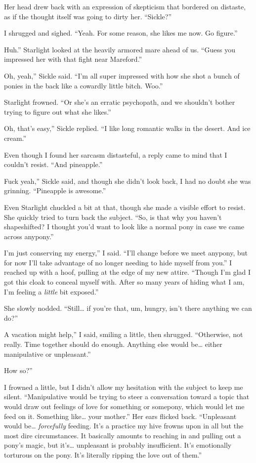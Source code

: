 Her head drew back with an expression of skepticism that bordered on distaste, as if the thought itself was going to dirty her. “Sickle?”

I shrugged and sighed. “Yeah. For some reason, she likes me now. Go figure.”

\leavevmode{}Huh.” Starlight looked at the heavily armored mare ahead of us. “Guess you impressed her with that fight near Mareford.”

\leavevmode{}Oh, yeah,” Sickle said. “I’m all super impressed with how she shot a bunch of ponies in the back like a cowardly little bitch. Woo.”

Starlight frowned. “Or she’s an erratic psychopath, and we shouldn’t bother trying to figure out what she likes.”

\leavevmode{}Oh, that’s easy,” Sickle replied. “I like long romantic walks in the desert. And ice cream.”

Even though I found her sarcasm distasteful, a reply came to mind that I couldn’t resist. “And pineapple.”

\leavevmode{}Fuck yeah,” Sickle said, and though she didn’t look back, I had no doubt she was grinning. “Pineapple is awesome.”

Even Starlight chuckled a bit at that, though she made a visible effort to resist. She quickly tried to turn back the subject. “So, is that why you haven’t shapeshifted? I thought you’d want to look like a normal pony in case we came across anypony.”

\leavevmode{}I’m just conserving my energy,” I said. “I’ll change before we meet anypony, but for now I’ll take advantage of no longer needing to hide myself from you.” I reached up with a hoof, pulling at the edge of my new attire. “Though I’m glad I got this cloak to conceal myself with. After so many years of hiding what I am, I’m feeling a \textit{little} bit exposed.”

She slowly nodded. “Still… if you’re that, um, hungry, isn’t there anything we can do?”

\leavevmode{}A vacation might help,” I said, smiling a little, then shrugged. “Otherwise, not really. Time together should do enough. Anything else would be… either manipulative or unpleasant.”

\leavevmode{}How so?”

I frowned a little, but I didn’t allow my hesitation with the subject to keep me silent. “Manipulative would be trying to steer a conversation toward a topic that would draw out feelings of love for something or somepony, which would let me feed on it. Something like… your mother.” Her ears flicked back. “Unpleasant would be… \textit{forcefully} feeding. It’s a practice my hive frowns upon in all but the most dire circumstances. It basically amounts to reaching in and pulling out a pony’s magic, but it’s… unpleasant is probably insufficient. It’s emotionally torturous on the pony. It’s literally ripping the love out of them.”

